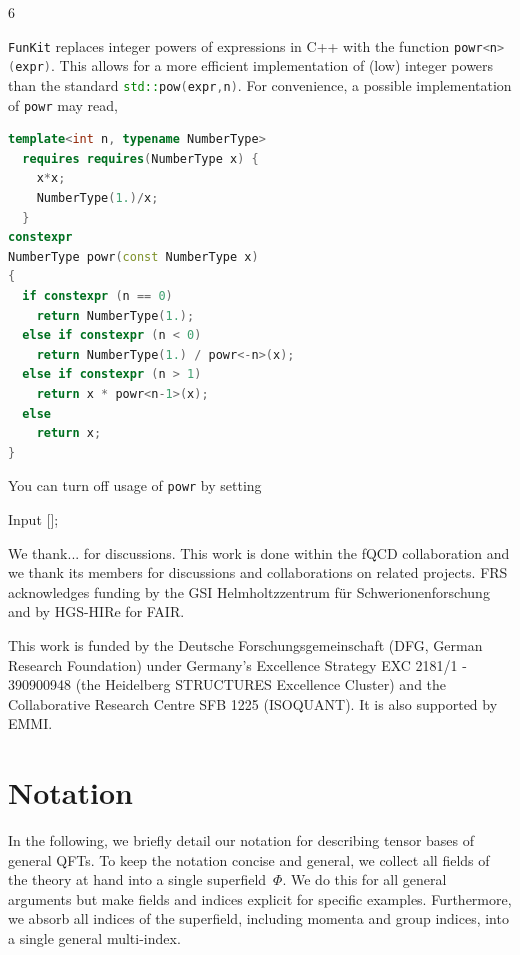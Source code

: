 6\documentclass[10pt,prd,nofootinbib,superscriptaddress,twocolumn]{revtex4-2}
\newcommand{\cpp}{\lstinline[language=C++,style=myStyle]}
\newcommand{\FunKit}{\texttt{FunKit}\xspace}
\begin{document}
%
\FunKit replaces integer powers of expressions in C++ with the function \cpp{powr<n>(expr)}. This allows for a more efficient implementation of (low) integer powers than the standard \cpp{std::pow(expr,n)}. For convenience, a possible implementation of \cpp{powr} may read,
%
\begin{lstlisting}[language=c++,style=myStyle]
template<int n, typename NumberType>
  requires requires(NumberType x) {
    x*x;
    NumberType(1.)/x;
  }
constexpr
NumberType powr(const NumberType x)
{
  if constexpr (n == 0)
    return NumberType(1.);
  else if constexpr (n < 0)
    return NumberType(1.) / powr<-n>(x);
  else if constexpr (n > 1)
    return x * powr<n-1>(x);
  else
    return x;
}
\end{lstlisting}
%
You can turn off usage of \cpp{powr} by setting
%
\begin{mmaCell}{Input}
 [];
\end{mmaCell}


\begin{acknowledgments}
We thank... for discussions. This work is done within the fQCD collaboration \cite{fQCD} and we thank its members for discussions and collaborations on related projects.
FRS acknowledges funding by the GSI Helmholtzzentrum f\"ur Schwerionenforschung and by HGS-HIRe for FAIR.

This work is funded by the Deutsche Forschungsgemeinschaft (DFG, German Research Foundation) under Germany’s Excellence Strategy EXC 2181/1 - 390900948 (the Heidelberg STRUCTURES Excellence Cluster) and the Collaborative Research Centre SFB 1225 (ISOQUANT). It is also supported by EMMI.
	
	
\end{acknowledgments}

\appendix


\section{Notation}
\label{app:notation}

In the following, we briefly detail our notation for describing tensor bases of general QFTs.
To keep the notation concise and general, we collect all fields of the theory at hand into a single superfield~$\Phi$. 
We do this for all general arguments but make fields and indices explicit for specific examples.
Furthermore, we absorb all indices of the superfield, including momenta and group indices, into a single general multi-index.
\end{document}
